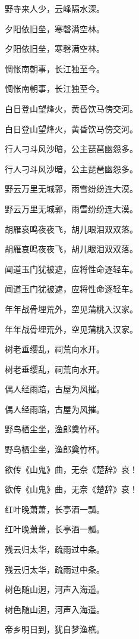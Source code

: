 \documentclass[12pt, a4paper, addpoints]{exam}
\begin{document}
\begin{questions}
\question[3] 野寺来人少，云峰隔水深。

\question[3] 夕阳依旧垒，寒磬满空林。

\question[3] 夕阳依旧垒，寒磬满空林。

\question[3] 惆怅南朝事，长江独至今。

\question[3] 惆怅南朝事，长江独至今。

\question[3] 白日登山望烽火，黄昏饮马傍交河。

\question[3] 白日登山望烽火，黄昏饮马傍交河。

\question[3] 行人刁斗风沙暗，公主琵琶幽怨多。

\question[3] 行人刁斗风沙暗，公主琵琶幽怨多。

\question[3] 野云万里无城郭，雨雪纷纷连大漠。

\question[3] 野云万里无城郭，雨雪纷纷连大漠。

\question[3] 胡雁哀鸣夜夜飞，胡儿眼泪双双落。

\question[3] 胡雁哀鸣夜夜飞，胡儿眼泪双双落。

\question[3] 闻道玉门犹被遮，应将性命逐轻车。

\question[3] 闻道玉门犹被遮，应将性命逐轻车。

\question[3] 年年战骨埋荒外，空见蒲桃入汉家。

\question[3] 年年战骨埋荒外，空见蒲桃入汉家。

\question[3] 树老垂缨乱，祠荒向水开。

\question[3] 树老垂缨乱，祠荒向水开。

\question[3] 偶人经雨踣，古屋为风摧。

\question[3] 偶人经雨踣，古屋为风摧。

\question[3] 野鸟栖尘坐，渔郎奠竹杯。

\question[3] 野鸟栖尘坐，渔郎奠竹杯。

\question[3] 欲传《山鬼》曲，无奈《楚辞》哀！

\question[3] 欲传《山鬼》曲，无奈《楚辞》哀！

\question[3] 红叶晚萧萧，长亭酒一瓢。

\question[3] 红叶晚萧萧，长亭酒一瓢。

\question[3] 残云归太华，疏雨过中条。

\question[3] 残云归太华，疏雨过中条。

\question[3] 树色随山迥，河声入海遥。

\question[3] 树色随山迥，河声入海遥。

\question[3] 帝乡明日到，犹自梦渔樵。


\end{questions}
\end{document}
